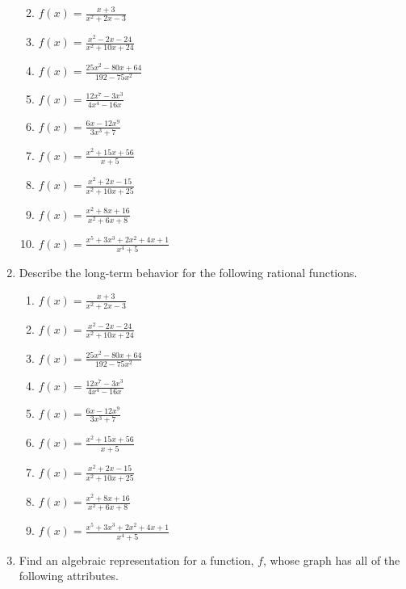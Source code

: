 \documentclass[
]{book}
\providecommand{\tightlist}{%
  \setlength{\itemsep}{0pt}\setlength{\parskip}{0pt}}
\theoremstyle{definition}
\theoremstyle{definition}
\theoremstyle{definition}
\theoremstyle{definition}
\theoremstyle{remark}
\begin{document}
\begin{enumerate}
  \begin{enumerate}
  \def\labelenumii{\alph{enumii}.}
  \tightlist
  \item
    \({\displaystyle f(x)=\frac{x+3}{x^2+2x-3} }\)
  \item
    \({\displaystyle f(x)=\frac{x^2-2x-24}{x^2+10x+24} }\)
  \item
    \({\displaystyle f(x)=\frac{25x^2-80x+64}{192-75x^2} }\)
  \item
    \({\displaystyle f(x)=\frac{12x^7-3x^3}{4x^4-16x} }\)
  \item
    \({\displaystyle f(x)=\frac{6x-12x^9}{3x^3+7} }\)
  \item
    \({\displaystyle f(x)=\frac{x^2+15x+56}{x+5} }\)
  \item
    \({\displaystyle f(x)=\frac{x^2+2x-15}{x^2+10x+25} }\)
  \item
    \({\displaystyle f(x)=\frac{x^2+8x+16}{x^2+6x+8} }\)
  \item
    \({\displaystyle f(x)=\frac{x^5+3x^3+2x^2+4x+1}{x^4+5} }\)
  \end{enumerate}
\item
  Describe the long-term behavior for the following rational functions.

  \begin{enumerate}
  \def\labelenumii{\alph{enumii}.}
  \tightlist
  \item
    \({\displaystyle f(x)=\frac{x+3}{x^2+2x-3} }\)
  \item
    \({\displaystyle f(x)=\frac{x^2-2x-24}{x^2+10x+24} }\)
  \item
    \({\displaystyle f(x)=\frac{25x^2-80x+64}{192-75x^2} }\)
  \item
    \({\displaystyle f(x)=\frac{12x^7-3x^3}{4x^4-16x} }\)
  \item
    \({\displaystyle f(x)=\frac{6x-12x^9}{3x^3+7} }\)
  \item
    \({\displaystyle f(x)=\frac{x^2+15x+56}{x+5} }\)
  \item
    \({\displaystyle f(x)=\frac{x^2+2x-15}{x^2+10x+25} }\)
  \item
    \({\displaystyle f(x)=\frac{x^2+8x+16}{x^2+6x+8} }\)
  \item
    \({\displaystyle f(x)=\frac{x^5+3x^3+2x^2+4x+1}{x^4+5} }\)
  \end{enumerate}
\item
  Find an algebraic representation for a function, \(f\), whose graph has all of the following attributes.


\end{enumerate}
\end{document}
